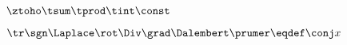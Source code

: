 \documentclass[fykos]{fksbatch}
\begin{document}
   $\ztoho \tsum \tprod \tint \const$

   $\tr \sgn \Laplace \rot \Div \grad \Dalembert \prumer \eqdef \conj x$
\end{document}
